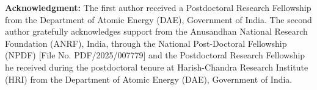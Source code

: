 \documentclass[a4paper,12pt,reqno]{amsart}
\theoremstyle{plain}
\numberwithin{equation}{section}
\begin{document}
	\medskip
	
	\textbf{Acknowledgment:} The first author received a Postdoctoral Research Fellowship from the Department of Atomic Energy (DAE), Government of India. The second author gratefully acknowledges support from the Anusandhan National Research Foundation (ANRF), India, through the National Post-Doctoral Fellowship (NPDF) [File No. PDF/2025/007779] and the Postdoctoral Research Fellowship he received during the postdoctoral tenure at Harish-Chandra Research Institute (HRI) from the Department of Atomic Energy (DAE), Government of India.
	\noindent
	
	\medskip
	
	
\end{document}
